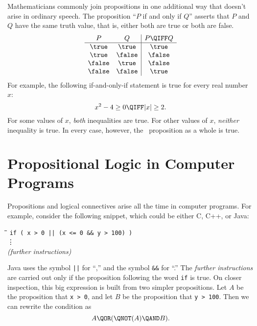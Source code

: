 Mathematicians commonly join propositions in one additional way that
doesn't arise in ordinary speech.  The proposition ``$P$ if and only
if $Q$'' asserts that $P$ and $Q$ have the same truth value, that is,
either both are true or both are false.
%
\[
\begin{array}{cc|c}
P & Q & P \QIFF Q \\ \hline
\true & \true & \true \\
\true & \false & \false \\
\false & \true & \false \\
\false & \false & \true
\end{array}
\]
For example, the following if-and-only-if statement is true for every real
number $x$:
%
\[
x^2 - 4 \geq 0 \QIFF |x| \geq 2.
\]
%
For some values of $x$, \textit{both} inequalities are true.  For
other values of $x$, \textit{neither} inequality is true.  In every
case, however, the \QIFF\ proposition as a whole is true.

\begin{problems}

\practiceproblems
{}

\classproblems
{}

\homeworkproblems
{}
\end{problems}


\section{Propositional Logic in Computer Programs}\label{propositions_in_programs_sec}

Propositions and logical connectives arise all the time in computer
programs.  For example, consider the following snippet, which could be
either C, C++, or Java:
%
\begin{tabbing}
\hspace{1in} \= \quad\quad \= \quad\quad \= \quad\quad \= \kill
\> \texttt{if ( x > 0 || (x <= 0 \&\& y > 100) )} \\
\> \> \vdots\\
\> \textit{(further instructions)}
\end{tabbing}
%
Java uses the symbol \texttt{||} for ``\QOR,'' and the
symbol \texttt{\&\&} for ``\QAND.''  The \textit{further instructions}
are carried out only if the proposition following the word \texttt{if}
is true.  On closer inspection, this big expression is built from two
simpler propositions.  Let $A$ be the proposition that \texttt{x > 0},
and let $B$ be the proposition that \texttt{y > 100}.  Then we can
rewrite the condition as
\begin{equation}\label{ANAB}
A \QOR (\QNOT(A) \QAND B).
\end{equation}

